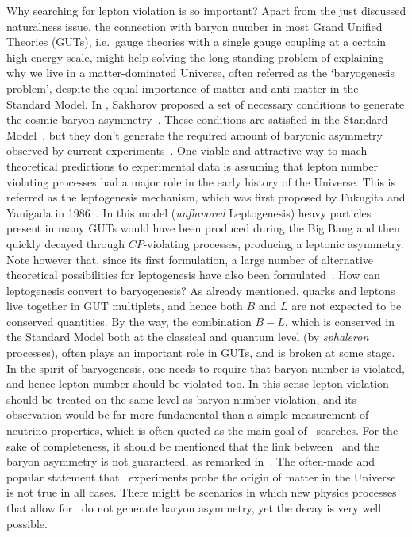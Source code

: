 Why searching for lepton violation is so important? Apart from the just discussed
naturalness issue, the connection with baryon number in most Grand Unified Theories
(GUTs), i.e.~gauge theories with a single gauge coupling at a certain high energy scale,
might help solving the long-standing problem of explaining why we live in a
matter-dominated Universe, often referred as the `baryogenesis problem', despite the equal
importance of matter and anti-matter in the Standard Model.  In , Sakharov proposed a
set of necessary conditions to generate the cosmic baryon asymmetry~\cite{Sakharov1991}.
These conditions are satisfied in the Standard Model~\cite{Buchmuller2005}, but they don't
generate the required amount of baryonic asymmetry observed by current
experiments~\cite{Zyla2020, Aghanim2018}.  One viable and attractive way to mach
theoretical predictions to experimental data is assuming that lepton number violating
processes had a major role in the early history of the Universe.  This is referred as the
leptogenesis mechanism, which was first proposed by Fukugita and Yanigada in
1986~\cite{Fukugita1986}. In this model (\emph{unflavored} Leptogenesis) heavy particles
present in many GUTs would have been produced during the Big Bang and then quickly decayed
through $CP$-violating processes, producing a leptonic asymmetry. Note however that, since
its first formulation, a large number of alternative theoretical possibilities for
leptogenesis have also been formulated~\cite{Buchmuller2005}.  How can leptogenesis convert to
baryogenesis? As already mentioned, quarks and leptons live together in GUT multiplets,
and hence both $B$ and $L$ are not expected to be conserved quantities. By the way, the
combination $B−L$, which is conserved in the Standard Model both at the classical and
quantum level (by \emph{sphaleron} processes), often plays an important role in GUTs, and is
broken at some stage.  In the spirit of baryogenesis, one needs to require that baryon
number is violated, and hence lepton number should be violated too. In this sense lepton
violation should be treated on the same level as baryon number violation, and its
observation would be far more fundamental than a simple measurement of neutrino
properties, which is often quoted as the main goal of \onbb\ searches.  For the sake of
completeness, it should be mentioned that the link between \onbb\ and the baryon asymmetry
is not guaranteed, as remarked in~\cite{Rodejohann2011}. The often-made and popular
statement that \onbb\ experiments probe the origin of matter in the Universe is not true
in all cases. There might be scenarios in which new physics processes that allow for
\onbb\ do not generate baryon asymmetry, yet the decay is very well possible.

